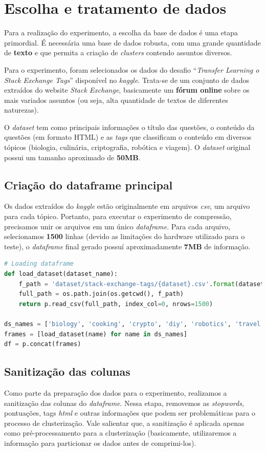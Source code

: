 \section{Escolha e tratamento de dados}
Para a realização do experimento, a escolha da base de dados é uma etapa primordial.
É necessária uma base de dados robusta, com uma grande quantidade de \textbf{texto} e que permita a criação de \emph{clusters} contendo assuntos diversos.

Para o experimento, foram selecionados os dados do desafio ``\emph{Transfer Learning o Stack Exchange Tags}''  disponível no \emph{kaggle}.
Trata-se de um conjunto de dados extraídos do website \emph{Stack Exchange}, basicamente um \textbf{fórum online} sobre os mais variados assuntos (ou seja, alta quantidade de textos de diferentes naturezas).

O \emph{dataset} tem como principais informações o título das questões, o conteúdo da questões (em formato HTML) e as \emph{tags} que classificam o conteúdo em diversos tópicos (biologia, culinária, criptografia, robótica e viagem).
O \emph{dataset} original possui um tamanho aproximado de \textbf{50MB}. 

\subsection{Criação do dataframe principal}
Os dados extraídos do \emph{kaggle} estão originalmente em arquivos \emph{csv}, um arquivo para cada tópico.
Portanto, para executar o experimento de compressão, precisamos unir os arquivos em um único \emph{dataframe}.
Para cada arquivo, selecionamos \textbf{1500} linhas (devido as limitações do hardware utilizado para o teste), o \emph{dataframe} final gerado possuí aproximadamente \textbf{7MB} de informação.


\begin{lstlisting}[language=Python, caption=Carregando base de dados]
# Loading dataframe
def load_dataset(dataset_name):
    f_path = 'dataset/stack-exchange-tags/{dataset}.csv'.format(dataset = dataset_name)
    full_path = os.path.join(os.getcwd(), f_path)
    return p.read_csv(full_path, index_col=0, nrows=1500)

ds_names = ['biology', 'cooking', 'crypto', 'diy', 'robotics', 'travel']
frames = [load_dataset(name) for name in ds_names]
df = p.concat(frames)
\end{lstlisting}

\subsection{Sanitização das colunas}
Como parte da preparação dos dados para o experimento, realizamos a sanitização das colunas do \emph{dataframe}.
Nessa etapa, removemos as \emph{stopwords}, pontuações, tags \emph{html} e outras informações que podem ser problemáticas para o processo de clusterização.
Vale salientar que, a sanitização é aplicada apenas como pré-processamento para a clusterização (basicamente, utilizaremos a informação para particionar os dados antes de comprimi-los).

